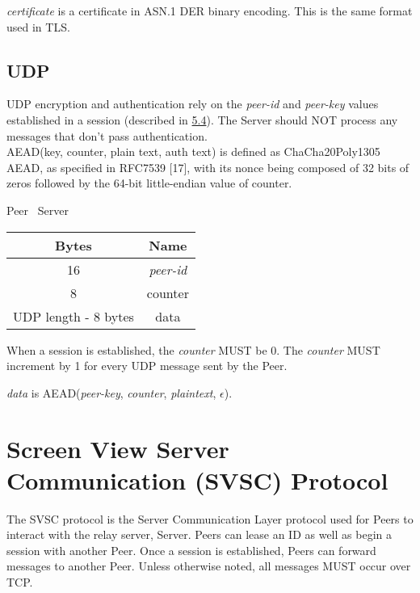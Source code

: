 \documentclass{article}
\begin{document}
    \emph{certificate} is a certificate in ASN.1 DER binary encoding. This is the same format used in TLS.




    \subsection{UDP}

    UDP encryption and authentication rely on the \emph{peer-id} and \emph{peer-key} values established in a session
    (described in \hyperlink{subsection.5.4}{5.4}). The Server should NOT
    process any messages that don't pass authentication.\\

    AEAD(key, counter, plain text, auth text) is defined as ChaCha20Poly1305 AEAD, as specified in RFC7539 [17],
    with its nonce being composed of 32 bits of zeros followed by the 64-bit little-endian value of counter.

    \begin{center}
        Peer \textrightarrow\ Server\\
        \begin{tabular}{|c|c|}
            \hline
            \textbf{Bytes}       & \textbf{Name}  \\
            \hline
            16                   & \emph{peer-id} \\
            \hline
            8                    & counter        \\
            \hline
            UDP length - 8 bytes & data           \\
            \hline
        \end{tabular}
    \end{center}

    When a session is established, the \emph{counter} MUST be 0. The \emph{counter} MUST increment by 1 for every UDP
    message sent by the Peer.

    \emph{data} is AEAD(\emph{peer-key}, \emph{counter}, \emph{plaintext}, $\epsilon$).

    \newpage


    \section{Screen View Server Communication (SVSC) Protocol }

    The SVSC protocol is the Server Communication Layer protocol used for Peers to interact with the relay server,
    Server. Peers can lease an ID as well as begin a session with another Peer. Once a session is established, Peers can
    forward messages to another Peer. Unless otherwise noted, all messages MUST occur over TCP.\\
\end{document}
